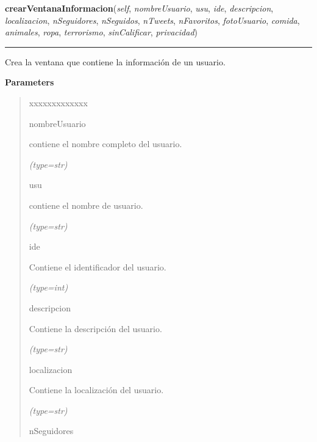 \hspace{.8\funcindent}\begin{boxedminipage}{\funcwidth}

    \raggedright \textbf{crearVentanaInformacion}(\textit{self}, \textit{nombreUsuario}, \textit{usu}, \textit{ide}, \textit{descripcion}, \textit{localizacion}, \textit{nSeguidores}, \textit{nSeguidos}, \textit{nTweets}, \textit{nFavoritos}, \textit{fotoUsuario}, \textit{comida}, \textit{animales}, \textit{ropa}, \textit{terrorismo}, \textit{sinCalificar}, \textit{privacidad})

    \vspace{-1.5ex}

    \rule{\textwidth}{0.5\fboxrule}
\setlength{\parskip}{2ex}
    Crea la ventana que contiene la información de un usuario.

\setlength{\parskip}{1ex}
      \textbf{Parameters}
      \vspace{-1ex}

      \begin{quote}
        \begin{Ventry}{xxxxxxxxxxxxx}

          \item[nombreUsuario]

          contiene el nombre completo del usuario.

            {\it (type=str)}

          \item[usu]

          contiene el nombre de usuario.

            {\it (type=str)}

          \item[ide]

          Contiene el identificador del usuario.

            {\it (type=int)}

          \item[descripcion]

          Contiene la descripción del usuario.

            {\it (type=str)}

          \item[localizacion]

          Contiene la localización del usuario.

            {\it (type=str)}

          \item[nSeguidores]


\end{Ventry}
\end{quote}
\end{boxedminipage}
